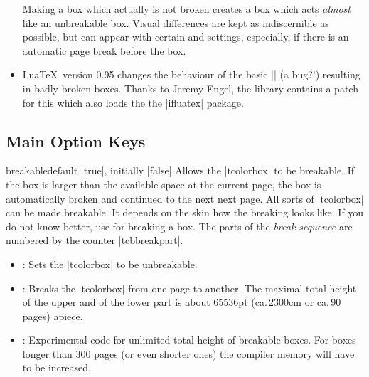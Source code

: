 \begin{itemize}
  Making a box  which actually is not broken creates
  a box which acts \emph{almost} like an unbreakable box. Visual differences
  are kept as indiscernible as possible, but can appear with certain
   and  settings, especially, if there
  is an automatic page break before the box.
\item{}
  Lua\TeX\ version 0.95 changes the behaviour of the basic |\vsplit| (a bug?!)
  resulting in badly broken boxes. Thanks to Jeremy Engel,
  the  library contains a patch for this which
  also loads the the |ifluatex| package.
\end{itemize}


\clearpage
\subsection{Main Option Keys}
\begin{docTcbKey}[][doc updated=2017-02-01]{breakable}{}{default |true|, initially |false|}
  Allows the |tcolorbox| to be breakable. If the box is larger than the
  available space at the current page, the box is automatically broken
  and continued to the next next page. All sorts of |tcolorbox| can be made
  breakable. It depends on the skin how the breaking looks like.
  If you do not know better, use  for breaking a box.
  The parts of the \emph{break sequence} are numbered
  by the counter |tcbbreakpart|.
  \begin{itemize}
  \item{}: Sets the |tcolorbox| to be unbreakable.
  \item{}: Breaks the |tcolorbox| from one page to another.
    The maximal total height of the upper and of the lower part is
    about 65536pt (ca.\,2300cm or ca.\,90 pages) apiece.
  \item{}: Experimental code for unlimited total height of
    breakable boxes.
    For boxes longer than 300 pages (or even shorter ones) the
    compiler memory will have to be increased.
  \end{itemize}

\begin{dispListing}

\begin{tcolorbox}[breakable,title=My breakable box]
\lipsum[1-6]
\end{tcolorbox}
\end{dispListing}
\end{docTcbKey}
{\tcbusetemp}


